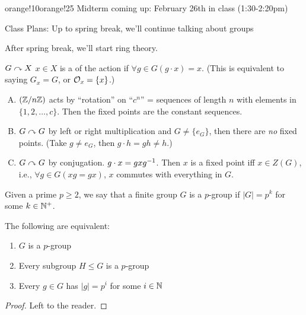 \documentclass[notes.tex]{subfiles}
\begin{document}
\begin{classnote}{orange!10}{orange!25}
Midterm coming up: February 26th in class (1:30-2:20pm)

Class Plans: Up to spring break, we'll continue talking about groups

After spring break, we'll start ring theory.
\end{classnote}

\begin{defn}
	$G\curvearrowright X$ $x\in X$ is a  of the action if $\forall g\in G (g\cdot x) = x$. (This is equivalent to saying $G_x = G$, or $\mathcal{O}_x = \{x\}$.)
\end{defn}

\begin{eg}\leavevmode
	\begin{enumerate}[(A)]
		\item $(\mathbb{Z}/{n}\mathbb{Z})$ acts by ``rotation'' on ``$c^n$'' = sequences of length $n$ with elements in $\{1, 2, \ldots, c\}$. Then the fixed points are the constant sequences.
		\item $G\curvearrowright G$ by left or right multiplication and $G\ne \{e_G\}$, then there are \emph{no} fixed points. (Take $g\ne e_G$, then $g\cdot h = gh \ne h$.)
		\item $G\curvearrowright G$ by conjugation. $g\cdot x = gx{g}^{-1}$. Then $x$ is a fixed point iff $x\in Z(G)$, i.e., $\forall g\in G (xg = gx)$, $x$ commutes with everything in $G$.
	\end{enumerate}
\end{eg}

\begin{defn}
	Given a prime $p\ge 2$, we say that a finite group $G$ is a $p$-group if $|G| = p^k$ for some $k\in\mathbb{N}^+$.
\end{defn}

\begin{proposition}
	The following are equivalent:
	\begin{enumerate}
		\item $G$ is a $p$-group
		\item Every subgroup $H\le G$ is a $p$-group
		\item Every $g\in G$ has $|g| = p^i$ for some $i\in\mathbb{N}$
	\end{enumerate}
\end{proposition}
\begin{proof}
	Left to the reader.
\end{proof}
\end{document}
